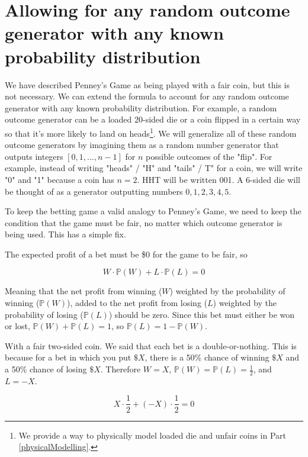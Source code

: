 \documentclass[english,12pt,a4paper,final]{article}
\begin{document}
\section{Allowing for any random outcome generator with any known probability distribution}

We have described Penney's Game as being played with a fair coin, but this is not necessary. We can extend the formula to account for any random outcome generator with any known probability distribution. For example, a random outcome generator can be a loaded 20-sided die or a coin flipped in a certain way so that it's more likely to land on heads\footnote{We provide a way to physically model loaded die and unfair coins in Part \ref{physicalModelling}.}. We will generalize all of these random outcome generators by imagining them as a random number generator that outputs integers $[0, 1, ..., n-1]$ for $n$ possible outcomes of the "flip". For example, instead of writing "heads" / "H" and "tails" / T" for a coin, we will write "0" and "1" because a coin has $n=2$. HHT will be written 001. A 6-sided die will be thought of as a generator outputting numbers $0, 1, 2, 3, 4, 5$.

To keep the betting game a valid analogy to Penney's Game, we need to keep the condition that the game must be fair, no matter which outcome generator is being used. This has a simple fix.

The expected profit of a bet must be \$0 for the game to be fair, so

\begin{equation*}
	W \cdot \mathbb{P}(W) + L \cdot \mathbb{P}(L)=0
\end{equation*}

Meaning that the net profit from winning ($W$) weighted by the probability of winning ($\mathbb{P}(W)$), added to the net profit from losing ($L$) weighted by the probability of losing ($\mathbb{P}(L)$) should be zero. Since this bet must either be won or lost, $\mathbb{P}(W) + \mathbb{P}(L) = 1$, so $\mathbb{P}(L) = 1-\mathbb{P}(W)$.

With a fair two-sided coin. We said that each bet is a double-or-nothing. This is because for a bet in which you put $\$X$, there is a 50\% chance of winning $\$X$ and a 50\% chance of losing $\$X$. Therefore $W=X$, $\mathbb{P}(W)=\mathbb{P}(L)=\frac{1}{2}$, and $L=-X$.

\begin{equation*}
	X \cdot \frac{1}{2} + (-X) \cdot \frac{1}{2}=0
\end{equation*}
\end{document}
